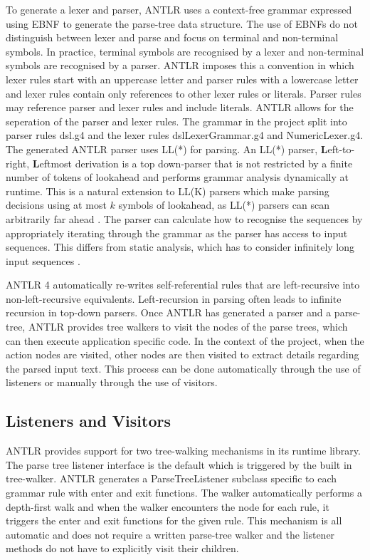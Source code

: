 To generate a lexer and parser, ANTLR uses a context-free grammar expressed using EBNF to generate the parse-tree data structure. The use of EBNFs do not distinguish between lexer and parse and focus on terminal and non-terminal symbols. In practice, terminal symbols are recognised by a lexer and non-terminal symbols are recognised by a parser. ANTLR imposes this a convention in which lexer rules start with an uppercase letter and parser rules with a lowercase letter and lexer rules contain only references to other lexer rules or literals. Parser rules may reference parser and lexer rules and include literals. ANTLR allows for the seperation of the parser and lexer rules. The grammar in the project split into parser rules dsl.g4 and the lexer rules dslLexerGrammar.g4 and NumericLexer.g4. The generated ANTLR parser uses LL(*) for parsing. An LL(*) parser, \textbf{L}eft-to-right, \textbf{L}eftmost derivation is a top down-parser that is not restricted by a finite number of tokens of lookahead and performs grammar analysis dynamically at runtime. This is a natural extension to LL(K) parsers which make parsing decisions using at most $k$ symbols of lookahead, as LL(*) parsers can scan arbitrarily far ahead \cite{bovet2008antlrworks}. The parser can calculate how to recognise the sequences by appropriately iterating through the grammar as the parser has access to input sequences. This differs from static analysis, which has to consider infinitely long input sequences \cite{parr2011ll}. \newline \par

ANTLR 4 automatically re-writes self-referential rules that are left-recursive into non-left-recursive equivalents. Left-recursion in parsing often leads to infinite recursion in top-down parsers. Once ANTLR has generated a parser and a parse-tree, ANTLR provides tree walkers to visit the nodes of the parse trees, which can then execute application specific code. In the context of the project, when the action nodes are visited, other nodes are then visited to extract details regarding the parsed input text. This process can be done automatically through the use of listeners or manually through the use of visitors.

\subsection{Listeners and Visitors}

ANTLR provides support for two tree-walking mechanisms in its runtime library. The parse tree listener interface is the default which is triggered by the built in tree-walker. ANTLR generates a ParseTreeListener subclass specific to each grammar rule with enter and exit functions. The walker automatically performs a depth-first walk and when the walker encounters the node for each rule, it triggers the enter and exit functions for the given rule. This mechanism is all automatic and does not require a written parse-tree walker and the listener methods do not have to explicitly visit their children.

